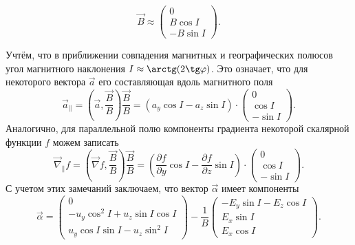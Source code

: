\documentclass[14pt, a4paper]{extarticle}
\begin{document}
\begin{equation}\label{magn_field_approx}\vec{B}\approx
\left(\begin{array}{crl}
0\\
B\cos I\\
-B\sin I
\end{array}\right).\end{equation}


Учтём, что в приближении совпадения магнитных и географических полюсов угол магнитного наклонения $I\approx \arctg(2\tg\varphi)$. Это означает, что для некоторого вектора $\vec{a}$ его составляющая вдоль магнитного поля \begin{equation}\vec{a}_\parallel = \left(\vec{a},\dfrac{\vec{B}}{B}\right)\dfrac{\vec{B}}{B} = (a_y\cos I - a_z\sin I)\cdot \left(\begin{array}{crl}
0\\
\cos I\\
-\sin I
\end{array}\right).\end{equation}
Аналогично, для параллельной полю компоненты градиента некоторой скалярной функции $f$ можем записать \begin{equation}\vec{\nabla}_\parallel f = \left(\vec{\nabla} f,\dfrac{\vec{B}}{B}\right)\dfrac{\vec{B}}{B} = \left(\dfrac{\partial f}{\partial y}\cos I - \dfrac{\partial f}{\partial z}\sin I\right)\cdot \left(\begin{array}{crl}
0\\
\cos I\\
-\sin I
\end{array}\right).\end{equation}
С учетом этих замечаний заключаем, что вектор $\vec{\alpha}$ имеет компоненты \begin{equation}\vec{\alpha} = 
\left(\begin{array}{crl}
0\\
-u_y\cos^2 I + u_z\sin I \cos I\\
u_y\cos I \sin I - u_z\sin^2 I
\end{array}\right) - \dfrac{1}{B}
\left(\begin{array}{crl}
-E_y\sin I - E_z\cos I\\
E_x\sin I\\
E_x\cos I
\end{array}\right).\end{equation}
\end{document}
